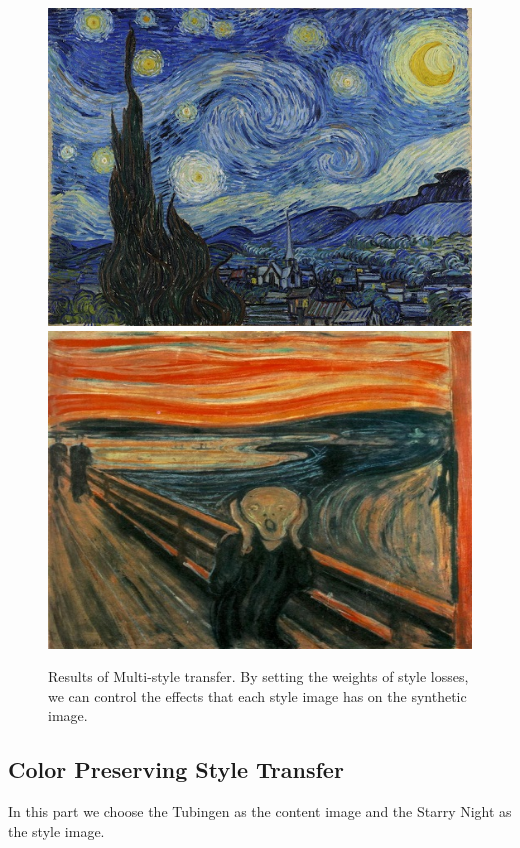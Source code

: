 \documentclass[runningheads]{llncs}
\begin{document}
\begin{figure}[h!]
{\begin{minipage}[b]{0.15\textwidth}
\includegraphics[width=1\textwidth]{neural_style_transfer/img/styles/starry-night.jpg} \\
\centering\includegraphics[width=1\textwidth]{neural_style_transfer/img/styles/the_scream.jpg}
\end{minipage}
}
\caption{Results of Multi-style transfer. By setting the weights of style losses, we can control the effects that each style image has on the synthetic image.}
\label{fig:multi}
\end{figure}

\subsection{Color Preserving Style Transfer}
In this part we choose the Tubingen as the content image and the Starry Night as the style image.
\end{document}
